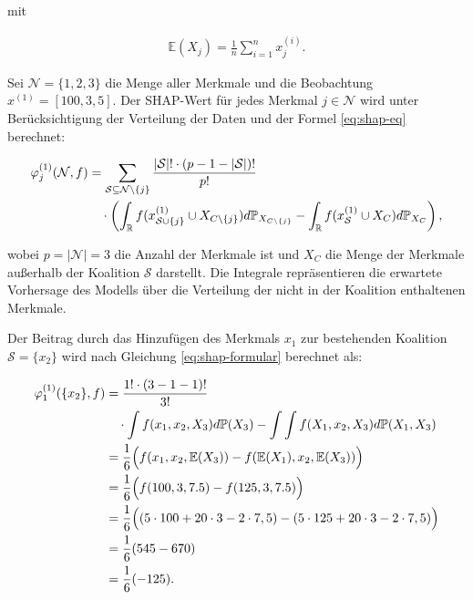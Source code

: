 mit 

\begin{align}
    \label{eq:e}
    \mathbb{E}(X_j) = \frac{1}{n} \sum_{i=1}^{n} x_j^{(i)}.
\end{align}     

Sei $\mathcal{N} = \{1, 2, 3\}$ die Menge aller Merkmale und die Beobachtung $x^{(1)} = [100, 3, 5]$. 
Der SHAP-Wert für jedes Merkmal $j \in \mathcal{N}$ wird unter Berücksichtigung der Verteilung der 
Daten und der Formel \ref{eq:shap-eq} berechnet:

\begin{align}
    \label{eq:shap-formular}
    \varphi^{(1)}_{j} (\mathcal{N}, f) &= \sum_{\mathcal{S} \subseteq \mathcal{N} \setminus \{j\}} \frac{|\mathcal{S}|! \cdot (p - 1 - |\mathcal{S}|)!}{p!} \\ \notag
    &\quad \cdot \left( \int_{\mathbb{R}} f(x^{(1)}_{\mathcal{S} \cup \{j\}} \cup X_{C \setminus \{j\}}) d\mathbb{P}_{X_{C \setminus \{j\}}} -
    \int_{\mathbb{R}} f(x^{(1)}_{\mathcal{S}} \cup X_{C}) d\mathbb{P}_{X_{C}} \right), 
\end{align}

wobei $p = |\mathcal{N}| = 3$ die Anzahl der Merkmale ist und $X_C$ die Menge der Merkmale 
außerhalb der Koalition $\mathcal{S}$ darstellt. Die Integrale repräsentieren die erwartete 
Vorhersage des Modells über die Verteilung der nicht in der Koalition enthaltenen Merkmale.

Der Beitrag durch das Hinzufügen des Merkmals $x_1$ zur bestehenden Koalition $\mathcal{S} = \{x_2\}$ wird
nach Gleichung \ref{eq:shap-formular} berechnet als:

\begin{align}
    \varphi^{(1)}_{1}(\{x_2\}, f) &= \frac{1! \cdot (3 - 1 - 1)!}{3!} \\ \notag
        &\quad \cdot \int f(x_1, x_2 , X_3) d\mathbb{P}(X_3) - \int\int f(X_1, x_2, X_3) d\mathbb{P}(X_1, X_3) \\ \notag
         &= \frac{1}{6} \Big(f(x_1, x_2, \mathbb{E}(X_3)) - f(\mathbb{E}(X_1), x_2, \mathbb{E}(X_3))\Big) \\ \notag
        &= \frac{1}{6} \Big( f(100, 3, 7.5) - f(125, 3, 7.5) \Big) \\ \notag
        &= \frac{1}{6} \Big( (5 \cdot 100 + 20 \cdot 3 - 2 \cdot 7,5) - (5 \cdot 125 + 20 \cdot 3 - 2 \cdot 7,5) \Big) \\ \notag
        &= \frac{1}{6} (545 - 670) \\ \notag
        &= \frac{1}{6} (-125).
\end{align}

